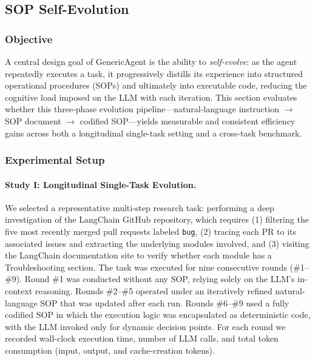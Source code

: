 
\subsection{SOP Self-Evolution}
\label{sec:exp_self_evolution}

\subsubsection{Objective}

A central design goal of GenericAgent is the ability to \emph{self-evolve}: as the agent repeatedly executes a task, it progressively distills its experience into structured operational procedures (SOPs) and ultimately into executable code, reducing the cognitive load imposed on the LLM with each iteration. This section evaluates whether this three-phase evolution pipeline—natural-language instruction $\rightarrow$ SOP document $\rightarrow$ codified SOP—yields measurable and consistent efficiency gains across both a longitudinal single-task setting and a cross-task benchmark.

\subsubsection{Experimental Setup}

\paragraph{Study I: Longitudinal Single-Task Evolution.}
We selected a representative multi-step research task: performing a deep investigation of the LangChain GitHub repository, which requires (1) filtering the five most recently merged pull requests labeled \texttt{bug}, (2) tracing each PR to its associated issues and extracting the underlying modules involved, and (3) visiting the LangChain documentation site to verify whether each module has a Troubleshooting section. The task was executed for nine consecutive rounds (\#1--\#9). Round \#1 was conducted without any SOP, relying solely on the LLM's in-context reasoning. Rounds \#2--\#5 operated under an iteratively refined natural-language SOP that was updated after each run. Rounds \#6--\#9 used a fully codified SOP in which the execution logic was encapsulated as deterministic code, with the LLM invoked only for dynamic decision points. For each round we recorded wall-clock execution time, number of LLM calls, and total token consumption (input, output, and cache-creation tokens).

